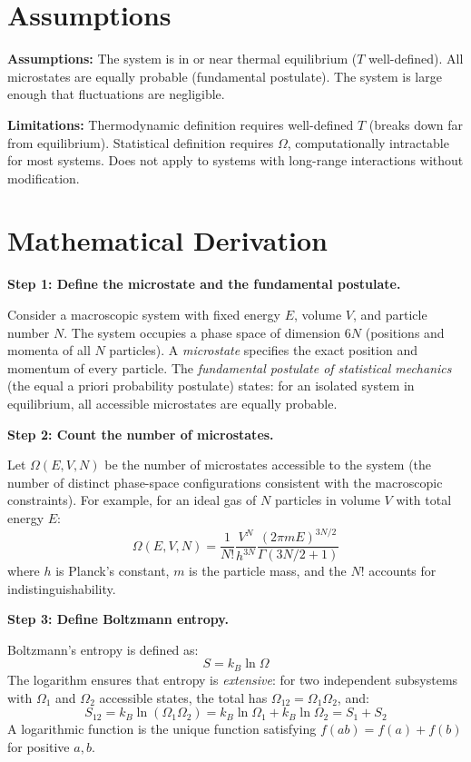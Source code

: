 \documentclass[11pt,openright]{book}
\begin{document}
\section*{Assumptions}

\textbf{Assumptions:} The system is in or near thermal equilibrium ($T$ well-defined). All microstates are equally probable (fundamental postulate). The system is large enough that fluctuations are negligible.


\textbf{Limitations:} Thermodynamic definition requires well-defined $T$ (breaks down far from equilibrium). Statistical definition requires $\Omega$, computationally intractable for most systems. Does not apply to systems with long-range interactions without modification.


\section*{Mathematical Derivation}

\textbf{Step 1: Define the microstate and the fundamental postulate.}

Consider a macroscopic system with fixed energy $E$, volume $V$, and particle number $N$. The system occupies a phase space of dimension $6N$ (positions and momenta of all $N$ particles). A \emph{microstate} specifies the exact position and momentum of every particle. The \emph{fundamental postulate of statistical mechanics} (the equal a priori probability postulate) states: for an isolated system in equilibrium, all accessible microstates are equally probable.

\textbf{Step 2: Count the number of microstates.}

Let $\Omega(E, V, N)$ be the number of microstates accessible to the system (the number of distinct phase-space configurations consistent with the macroscopic constraints). For example, for an ideal gas of $N$ particles in volume $V$ with total energy $E$:
\begin{equation}
\Omega(E, V, N) = \frac{1}{N!}\frac{V^N}{h^{3N}}\frac{(2\pi m E)^{3N/2}}{\Gamma(3N/2 + 1)}
\end{equation}
where $h$ is Planck's constant, $m$ is the particle mass, and the $N!$ accounts for indistinguishability.

\textbf{Step 3: Define Boltzmann entropy.}

Boltzmann's entropy is defined as:
\begin{equation}
S = k_B \ln \Omega
\end{equation}
The logarithm ensures that entropy is \emph{extensive}: for two independent subsystems with $\Omega_1$ and $\Omega_2$ accessible states, the total has $\Omega_{12} = \Omega_1 \Omega_2$, and:
\begin{equation}
S_{12} = k_B \ln(\Omega_1\Omega_2) = k_B\ln\Omega_1 + k_B\ln\Omega_2 = S_1 + S_2
\end{equation}
A logarithmic function is the unique function satisfying $f(ab) = f(a) + f(b)$ for positive $a, b$.
\end{document}
